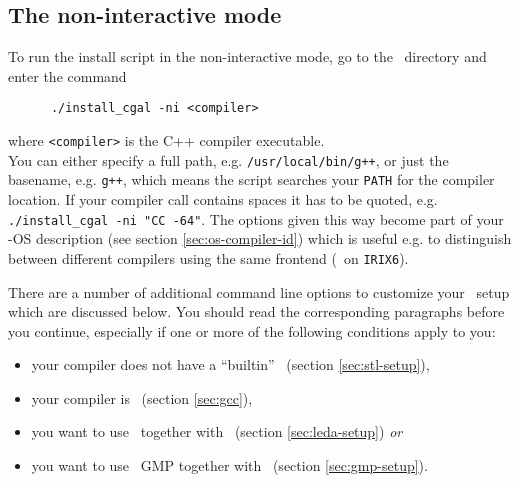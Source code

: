
\subsection{The non-interactive mode \label{sec:non-interactive}}

To run the install script in the non-interactive mode, go to the
\cgaldir\ directory and enter the command
\begin{verbatim}
      ./install_cgal -ni <compiler>
\end{verbatim}
where \texttt{<compiler>} is the C++ compiler executable.\\
You can either specify a full path, e.g. \texttt{/usr/local/bin/g++},
or just the basename, e.g. \texttt{g++}, which means the script
searches your {\tt PATH} for the compiler location. If your compiler
call contains spaces it has to be quoted, e.g. {\tt ./install\_cgal
  -ni "CC -64"}.  The options given this way become part of your
\cgal-OS description (see section \ref{sec:os-compiler-id}) which is
useful e.g. to distinguish between different compilers using the same
frontend (\mipsprocc\ on {\tt IRIX6}).

There are a number of additional command line options to customize
your \cgal\ setup which are discussed below. You should read the
corresponding paragraphs before you continue, especially if one or
more of the following conditions apply to you:
\begin{itemize}
\item your compiler does not have a ``builtin'' \stl\ (section
  \ref{sec:stl-setup}),
\item your compiler is \ (section \ref{sec:gcc}),
\item you want to use \leda\ together with \cgal\ (section
  \ref{sec:leda-setup}) {\it or}
\item you want to use \gnu\ GMP together with \cgal\ (section
  \ref{sec:gmp-setup}).
\end{itemize}

